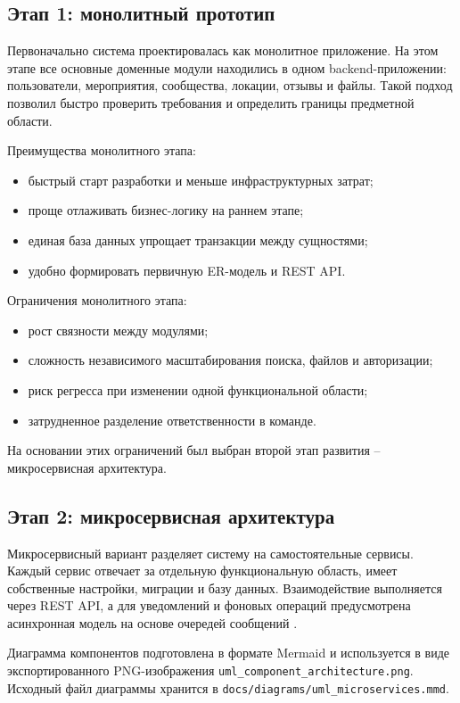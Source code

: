 \subsection{Этап 1: монолитный прототип}

Первоначально система проектировалась как монолитное приложение. На этом этапе все основные доменные модули находились в одном backend-приложении: пользователи, мероприятия, сообщества, локации, отзывы и файлы. Такой подход позволил быстро проверить требования и определить границы предметной области.

Преимущества монолитного этапа:
\begin{itemize}
    \item быстрый старт разработки и меньше инфраструктурных затрат;
    \item проще отлаживать бизнес-логику на раннем этапе;
    \item единая база данных упрощает транзакции между сущностями;
    \item удобно формировать первичную ER-модель и REST API.
\end{itemize}

Ограничения монолитного этапа:
\begin{itemize}
    \item рост связности между модулями;
    \item сложность независимого масштабирования поиска, файлов и авторизации;
    \item риск регресса при изменении одной функциональной области;
    \item затрудненное разделение ответственности в команде.
\end{itemize}

На основании этих ограничений был выбран второй этап развития -- микросервисная архитектура.

\subsection{Этап 2: микросервисная архитектура}

Микросервисный вариант разделяет систему на самостоятельные сервисы. Каждый сервис отвечает за отдельную функциональную область, имеет собственные настройки, миграции и базу данных. Взаимодействие выполняется через REST API, а для уведомлений и фоновых операций предусмотрена асинхронная модель на основе очередей сообщений \cite{kafka}.

Диаграмма компонентов подготовлена в формате Mermaid и используется в виде экспортированного PNG-изображения \nolinkurl{uml_component_architecture.png}. Исходный файл диаграммы хранится в \texttt{docs/diagrams/uml\_microservices.mmd}.


